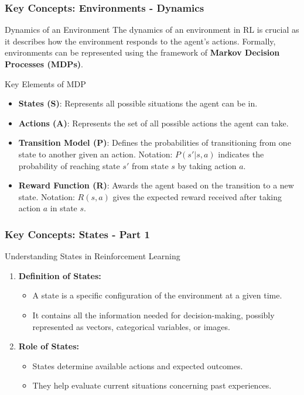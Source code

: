 \documentclass{beamer}
\begin{document}
\begin{frame}[fragile]
    \frametitle{Key Concepts: Environments - Dynamics}
    \begin{block}{Dynamics of an Environment}
        The dynamics of an environment in RL is crucial as it describes how the environment responds to the agent's actions. 
        Formally, environments can be represented using the framework of \textbf{Markov Decision Processes (MDPs)}.
    \end{block}

    \begin{block}{Key Elements of MDP}
        \begin{itemize}
            \item \textbf{States (S)}: Represents all possible situations the agent can be in.
            \item \textbf{Actions (A)}: Represents the set of all possible actions the agent can take.
            \item \textbf{Transition Model (P)}: Defines the probabilities of transitioning from one state to another given an action. 
                Notation: $ P(s'|s, a) $ indicates the probability of reaching state $ s' $ from state $ s $ by taking action $ a $.
            \item \textbf{Reward Function (R)}: Awards the agent based on the transition to a new state. 
                Notation: $ R(s, a) $ gives the expected reward received after taking action $ a $ in state $ s $.
        \end{itemize}
    \end{block}
\end{frame}

\begin{frame}[fragile]
    \frametitle{Key Concepts: States - Part 1}
    \begin{block}{Understanding States in Reinforcement Learning}
        \begin{enumerate}
            \item \textbf{Definition of States:}
            \begin{itemize}
                \item A state is a specific configuration of the environment at a given time.
                \item It contains all the information needed for decision-making, possibly represented as vectors, categorical variables, or images.
            \end{itemize}
            
            \item \textbf{Role of States:}
            \begin{itemize}
                \item States determine available actions and expected outcomes.
                \item They help evaluate current situations concerning past experiences.
            \end{itemize}
        \end{enumerate}
    \end{block}
\end{frame}
\end{document}

